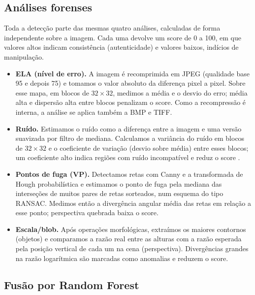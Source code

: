 \documentclass[12pt]{article}
\begin{document}
\subsection{Análises forenses}

Toda a detecção parte das mesmas quatro análises, calculadas de forma
independente sobre a imagem. Cada uma devolve um score de 0 a 100, em que valores
altos indicam consistência (autenticidade) e valores baixos, indícios de
manipulação.

\begin{itemize}
  \item \textbf{ELA (nível de erro).} A imagem é recomprimida em JPEG
    (qualidade base 95 e depois 75) e tomamos o valor absoluto da diferença
    pixel a pixel. Sobre esse mapa, em blocos de $32\times32$, medimos a média e
    o desvio do erro; média alta e dispersão alta entre blocos penalizam o score.
    Como a recompressão é interna, a análise se aplica também a BMP e TIFF.
  \item \textbf{Ruído.} Estimamos o ruído como a diferença entre a imagem e uma
    versão suavizada por filtro de mediana. Calculamos a variância do ruído em
    blocos de $32\times32$ e o coeficiente de variação (desvio sobre média) entre
    esses blocos; um coeficiente alto indica regiões com ruído incompatível e
    reduz o score \cite{mahdian2009}.
  \item \textbf{Pontos de fuga (VP).} Detectamos retas com Canny e a transformada
    de Hough probabilística e estimamos o ponto de fuga pela mediana das
    interseções de muitos pares de retas sorteados, num esquema do tipo RANSAC.
    Medimos então a divergência angular média das retas em relação a esse ponto;
    perspectiva quebrada baixa o score.
  \item \textbf{Escala/blob.} Após operações morfológicas, extraímos os maiores
    contornos (objetos) e comparamos a razão real entre as alturas com a razão
    esperada pela posição vertical de cada um na cena (perspectiva). Divergências
    grandes na razão logarítmica são marcadas como anomalias e reduzem o score.
\end{itemize}

\subsection{Fusão por Random Forest}
\end{document}
